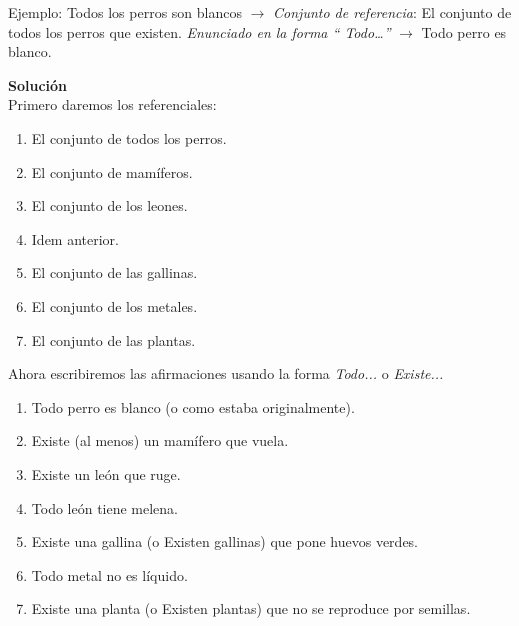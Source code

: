 \documentclass[12pt]{article}
\theoremstyle{definition}
\theoremstyle{remark}
\begin{document}
\begin{enumerate}
Ejemplo: Todos los perros son blancos $\rightarrow$  \textit{Conjunto de referencia}: El conjunto de todos los perros que existen. \textit{Enunciado en la forma “ Todo…” }  $\rightarrow$ Todo perro es blanco.

\noindent
\textbf{Solución} \\
Primero daremos los referenciales:
 \begin{multicols}{2}
 \begin{enumerate}
 \setlength\itemsep{0em}
     	\item El conjunto de todos los perros.
	\item El conjunto de mamíferos.
	\item El conjunto de los leones.
	\item Idem anterior.
	\item El conjunto de las gallinas.
	\item El conjunto de los metales.
	\item El conjunto de las plantas.
  \end{enumerate}
\end{multicols}

Ahora escribiremos las afirmaciones usando la forma  \textit{Todo...} o \textit{Existe...} 
\begin{multicols}{2}

 \begin{enumerate}
 \setlength\itemsep{0em}
     	\item Todo perro es blanco (o como estaba originalmente). 
	\item Existe (al menos) un mamífero que vuela.
	\item Existe un león que ruge.
	\item Todo león tiene melena.
	\item Existe una gallina (o Existen gallinas) que pone huevos verdes.
	\item Todo metal no es líquido.
	\item Existe una planta (o Existen plantas) que no se reproduce por semillas.
  \end{enumerate}
\end{multicols}


\end{enumerate}
\end{document}
